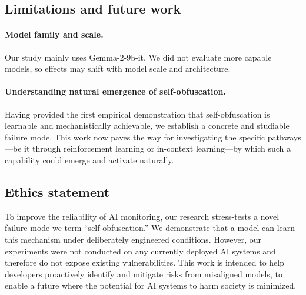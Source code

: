 \documentclass{article} %
\begin{document}
\subsection{Limitations and future work}

\paragraph{Model family and scale.} Our study mainly uses Gemma-2-9b-it. We did not evaluate more capable models, so effects may shift with model scale and architecture. 


\paragraph{Understanding natural emergence of self-obfuscation.} 
Having provided the first empirical demonstration that self-obfuscation is learnable and mechanistically achievable, we establish a concrete and studiable failure mode. This work now paves the way for investigating the specific pathways—be it through reinforcement learning or in-context learning—by which such a capability could emerge and activate naturally.

\subsection*{Ethics statement}

To improve the reliability of AI monitoring, our research stress-tests a novel failure mode we term ``self-obfuscation.'' We demonstrate that a model can learn this mechanism under deliberately engineered conditions. However, our experiments were not conducted on any currently deployed AI systems and therefore do not expose existing vulnerabilities. This work is intended to help developers proactively identify and mitigate risks from misaligned models, to enable a future where the potential for AI systems to harm society is minimized.
\end{document}
